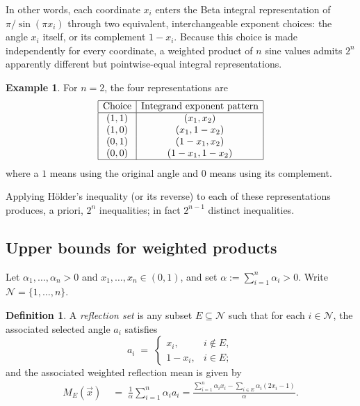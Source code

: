 \documentclass[12pt]{amsart}
\theoremstyle{definition}
\newtheorem{definition}{Definition}[section]
\newtheorem{example}{Example}[section]
\begin{document}
In other words, each coordinate $x_i$ enters the Beta integral representation of $\pi/\sin(\pi x_i)$ through two equivalent, interchangeable exponent choices: the angle $x_i$ itself, or its complement $1-x_i$. Because this choice is made independently for every coordinate, a weighted product of $n$ sine values admits $2^n$ apparently different but pointwise-equal integral representations.

\begin{example}
For $n=2$, the four representations are
\[
\begin{array}{|c|c|}
 \hline \text{Choice} & \text{Integrand exponent pattern} \\
\hline
(1,1) & (x_1, x_2) \\
(1,0) & (x_1, 1-x_2) \\
(0,1) & (1-x_1, x_2) \\
(0,0) & (1-x_1, 1-x_2)\\ \hline
\end{array}
\]
where a $1$ means using the original angle and $0$ means using its complement.
\end{example}

Applying H\"older's inequality (or its reverse) to each of these representations produces, a priori, $2^n$ inequalities; in fact $2^{n-1}$ distinct inequalities.

\subsection{Upper bounds for weighted products}
\label{ssec:upper}

Let $\alpha_1,\ldots,\alpha_n > 0$ and $x_1,\ldots,x_n \in (0,1)$, and set
$\alpha := \sum_{i=1}^{n} \alpha_i > 0$. Write $\mathcal{N} = \{1,\ldots,n\}$.

\begin{definition}\label{def:upper-reflection}
A \emph{reflection set} is any subset $E \subseteq \mathcal N$ such that for
each $i\in\mathcal N$, the associated selected angle $a_i$ satisfies
\[
a_i \;=\; \begin{cases} x_i, & i \notin E,\\ 1-x_i, & i \in E ;\end{cases}
\]
and the associated weighted reflection mean is given by
\begin{equation}\label{eq:Mdef}
\begin{aligned}
M_E(\vec x) &\;=\; \frac{1}{\alpha}\sum_{i=1}^n \alpha_i a_i
= \frac{\displaystyle\sum_{i=1}^{n} \alpha_i x_i - \sum_{i \in E} \alpha_i (2x_i - 1)}{\alpha}.
\end{aligned}
\end{equation}
\end{definition}
\end{document}
